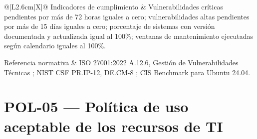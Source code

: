 \documentclass[11pt, a4paper, oneside]{report}
\begin{document}
\begin{xltabular}{\textwidth}{@{}|L{2.6cm}|X|@{}}
{\small Indicadores de cumplimiento} & {\small Vulnerabilidades críticas pendientes por más de 72 horas iguales a cero; vulnerabilidades altas pendientes por más de 15 días iguales a cero; porcentaje de sistemas con versión documentada y actualizada igual al 100\%; ventanas de mantenimiento ejecutadas según calendario iguales al 100\%.} \\ \hline

{\small Referencia normativa} & {\small ISO 27001:2022 A.12.6, Gestión de Vulnerabilidades Técnicas \citep{iso27001}; NIST CSF PR.IP-12, DE.CM-8 \citep{nistcsf}; CIS Benchmark para Ubuntu 24.04.} \\ \hline

\end{xltabular}

\normalsize

\section{POL-05 — Política de uso aceptable de los recursos de TI}

\renewcommand{\arraystretch}{1.3}
\footnotesize
{}
\end{document}
